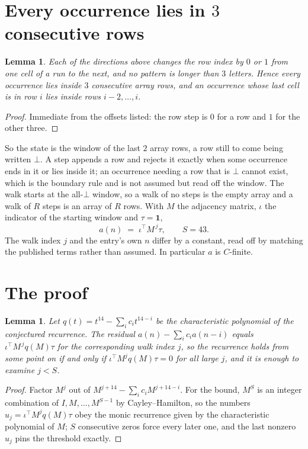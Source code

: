 \documentclass[11pt,a4paper]{article}
\theoremstyle{plain}
\newtheorem{lemma}[theorem]{Lemma}
\theoremstyle{definition}
\begin{document}
\section{Every occurrence lies in $3$ consecutive rows}

\begin{lemma}\label{lem:win}
Each of the directions above changes the row index by $0$ or $1$ from one cell of a run to the
next, and no pattern is longer than $3$ letters. Hence every occurrence lies inside $3$
consecutive array rows, and an occurrence whose last cell is in row $i$ lies inside rows
$i-2,\dots,i$.
\end{lemma}

\begin{proof}
Immediate from the offsets listed: the row step is $0$ for a row and $1$ for the other three.
\end{proof}

So the state is the window of the last $2$ array rows, a row still to come being written
$\bot$. A step appends a row and rejects it exactly when some occurrence ends in it or lies
inside it; an occurrence needing a row that is $\bot$ cannot exist, which is the boundary rule
and is not assumed but read off the window. The walk starts at the all-$\bot$ window, so a walk
of no steps is the empty array and a walk of $R$ steps is an array of $R$ rows. With $M$ the
adjacency matrix, $\iota$ the indicator of the starting window and $\tau=\mathbf{1}$,
\[
a(n)\;=\;\iota^{\!\top}M^{\,j}\tau ,\qquad S=43.
\]
The walk index $j$ and the entry's own $n$ differ by a constant, read off by matching the
published terms rather than assumed. In particular $a$ is $C$-finite.

\section{The proof}

\begin{lemma}\label{lem:crit}
Let $q(t)=t^{14}-\sum_i c_it^{14-i}$ be the characteristic polynomial of the
conjectured recurrence. The residual $a(n)-\sum_ic_ia(n-i)$ equals
$\iota^{\!\top}M^{\,j}q(M)\tau$ for the corresponding walk index $j$, so the recurrence
holds from some point on if and only if $\iota^{\!\top}M^{j}q(M)\tau=0$ for all large $j$,
and it is enough to examine $j<S$.
\end{lemma}

\begin{proof}
Factor $M^{j}$ out of $M^{j+14}-\sum_ic_iM^{j+14-i}$. For the bound, $M^{S}$
is an integer combination of $I,M,\dots,M^{S-1}$ by Cayley--Hamilton, so the numbers
$u_j=\iota^{\!\top}M^{j}q(M)\tau$ obey the monic recurrence given by the characteristic
polynomial of $M$; $S$ consecutive zeros force every later one, and the last nonzero $u_j$
pins the threshold exactly.
\end{proof}
\end{document}
